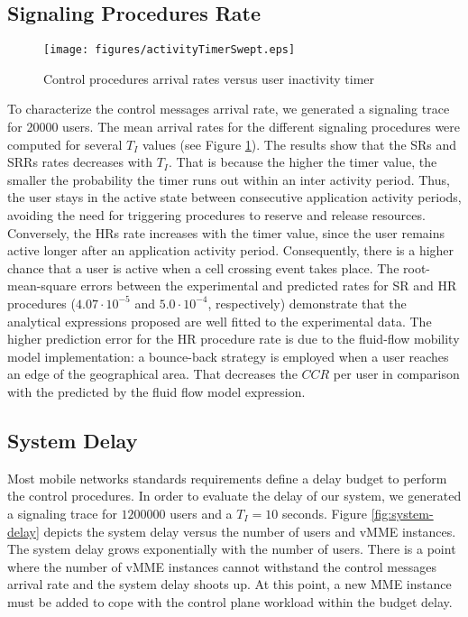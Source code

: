 \documentclass[conference]{IEEEtran}
\begin{document}
\subsection{Signaling Procedures Rate}
\label{sec:arrival-rate-results}
\begin{figure}[tb]
\begin{center}
\texttt{[image: figures/activityTimerSwept.eps]}
\end{center}
\caption{Control procedures arrival rates versus user inactivity timer}
\label{fig:lambdas}
\end{figure}


To characterize the control messages arrival rate, we generated a signaling trace for 20000 users. The mean arrival rates for the different signaling procedures were computed for several $T_I$ values (see Figure \ref{fig:lambdas}). The results show that the SRs and SRRs rates decreases with $T_I$. That is because the higher the timer value, the smaller the probability the timer runs out within an inter activity period. Thus, the user stays in the active state between consecutive application activity periods, avoiding the need for triggering procedures to reserve and release resources. 
Conversely, the HRs rate increases with the timer value, since the user remains active longer after an application activity period. Consequently, there is a higher chance that a user is active when a cell crossing event takes place.
 The root-mean-square errors between the experimental and predicted rates for SR and HR procedures ($4.07\cdot 10^{-5}$ and $5.0\cdot 10^{-4}$, respectively) demonstrate that the analytical expressions proposed are well fitted to the experimental data. The higher prediction error for the HR procedure rate is due to the fluid-flow mobility model implementation: a bounce-back strategy is employed when a user reaches an edge of the geographical area. That decreases the $CCR$ per user in comparison with the predicted by the fluid flow model expression.       

\subsection{System Delay}

 Most mobile networks standards requirements define a delay budget to perform the control procedures. In order to evaluate the delay of our system, we generated a signaling trace for $1200000$ users and a $T_I=10$ seconds. Figure \ref{fig:system-delay} depicts the system delay versus the number of users and vMME instances. The system delay grows exponentially with the number of users. There is a point where the number of vMME instances cannot withstand the control messages arrival rate and the system delay shoots up. At this point, a new MME instance must be added to cope with the control plane workload within the budget delay.
\end{document}
